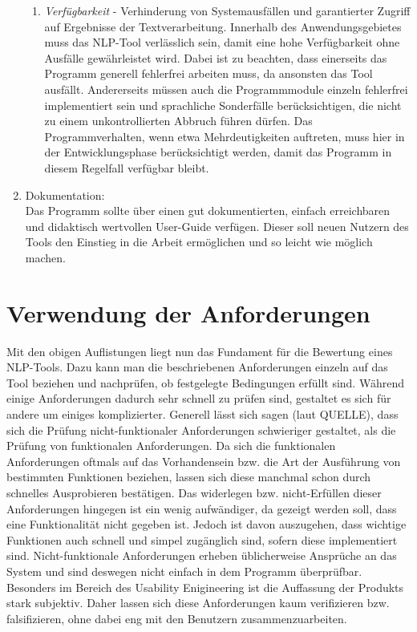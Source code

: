 \documentclass[12pt]{report}
\begin{document}
\begin{enumerate}
\begin{enumerate}
\item \textit{Verfügbarkeit} - Verhinderung von Systemausfällen und garantierter Zugriff auf Ergebnisse der Textverarbeitung. Innerhalb des Anwendungsgebietes muss das NLP-Tool verlässlich sein, damit eine hohe Verfügbarkeit ohne Ausfälle gewährleistet wird. Dabei ist zu beachten, dass einerseits das Programm generell fehlerfrei arbeiten muss, da ansonsten das Tool ausfällt. Andererseits müssen auch die Programmmodule einzeln fehlerfrei implementiert sein und sprachliche Sonderfälle berücksichtigen, die nicht zu einem unkontrollierten Abbruch führen dürfen. Das Programmverhalten, wenn etwa Mehrdeutigkeiten auftreten, muss hier in der Entwicklungsphase berücksichtigt werden, damit das Programm in diesem Regelfall verfügbar bleibt.
\end{enumerate} 

\item Dokumentation:\\
Das Programm sollte über einen gut dokumentierten, einfach erreichbaren und didaktisch wertvollen User-Guide verfügen. Dieser soll neuen Nutzern des Tools den Einstieg in die Arbeit ermöglichen und so leicht wie möglich machen.
\end{enumerate}

\section{Verwendung der Anforderungen}
Mit den obigen Auflistungen liegt nun das Fundament für die Bewertung eines NLP-Tools. Dazu kann man die beschriebenen Anforderungen einzeln auf das Tool beziehen und nachprüfen, ob festgelegte Bedingungen erfüllt sind. Während einige Anforderungen dadurch sehr schnell zu prüfen sind, gestaltet es sich für andere um einiges komplizierter. Generell lässt sich sagen (laut QUELLE), dass sich die Prüfung nicht-funktionaler Anforderungen schwieriger gestaltet, als die Prüfung von funktionalen Anforderungen. Da sich die funktionalen Anforderungen oftmals auf das Vorhandensein bzw. die Art der Ausführung von bestimmten Funktionen beziehen, lassen sich diese manchmal schon durch schnelles Ausprobieren bestätigen. Das widerlegen bzw. nicht-Erfüllen dieser Anforderungen hingegen ist ein wenig aufwändiger, da gezeigt werden soll, dass eine Funktionalität nicht gegeben ist. Jedoch ist davon auszugehen, dass wichtige Funktionen auch schnell und simpel zugänglich sind, sofern diese implementiert sind. 
Nicht-funktionale Anforderungen erheben üblicherweise Ansprüche an das System und sind deswegen nicht einfach in dem Programm überprüfbar. Besonders im Bereich des Usability Enigineering ist die Auffassung der Produkts stark subjektiv. Daher lassen sich diese Anforderungen kaum verifizieren bzw. falsifizieren, ohne dabei eng mit den Benutzern zusammenzuarbeiten. 
\end{document}
